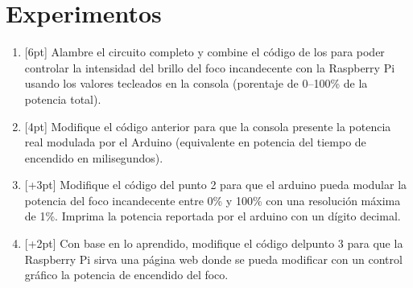 %
%


\section{Experimentos}%
\label{sec:experiments}

\begin{enumerate}
	\item{} [6pt] Alambre el circuito completo y combine el código de los  para poder controlar la intensidad del brillo del foco incandecente con la Raspberry Pi usando los valores tecleados en la consola (porentaje de 0--100\% de la potencia total).

	\item{} [4pt] Modifique el código anterior para que la consola presente la potencia real modulada por el Arduino (equivalente en potencia del tiempo de encendido en milisegundos).

	\item{} [+3pt] Modifique el código del punto 2 para que el arduino pueda modular la potencia del foco incandecente entre 0\% y 100\% con una resolución máxima de 1\%. Imprima la potencia reportada por el arduino con un dígito decimal.

	\item{} [+2pt] Con base en lo aprendido, modifique el código delpunto 3 para que la Raspberry Pi sirva una página web donde se pueda modificar con un control gráfico la potencia de encendido del foco.
\end{enumerate}
